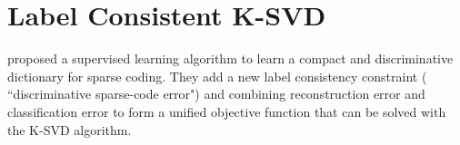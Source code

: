 \section{Label Consistent K-SVD}
\cite{6516503} proposed a supervised learning algorithm to learn a compact and discriminative dictionary for sparse coding. They add a new label consistency constraint ( ``discriminative sparse-code error") and combining reconstruction error and classification error to form a unified objective function that can be solved with the K-SVD algorithm.



